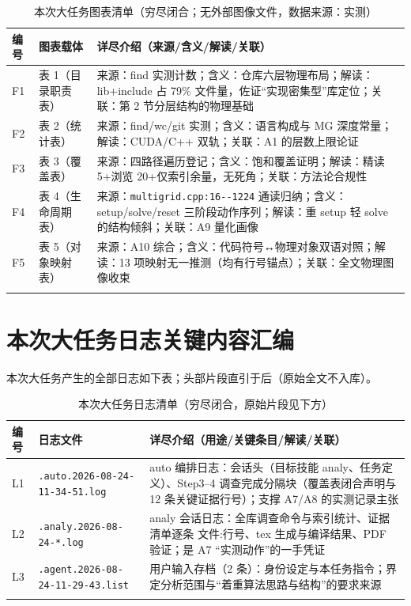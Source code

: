 \documentclass[UTF8]{ctexart}
\begin{document}
\begin{xltabular}{\textwidth}{llX}
\toprule
编号 & 图表载体 & 详尽介绍（来源/含义/解读/关联） \\
\midrule
\endhead
F1 & 表 1（目录职责表） & 来源：find 实测计数；含义：仓库六层物理布局；解读：lib+include 占 79\% 文件量，佐证``实现密集型''库定位；关联：第 2 节分层结构的物理基础 \\
F2 & 表 2（统计表） & 来源：find/wc/git 实测；含义：语言构成与 MG 深度常量；解读：CUDA/C++ 双轨；关联：A1 的层数上限论证 \\
F3 & 表 3（覆盖表） & 来源：四路径遍历登记；含义：饱和覆盖证明；解读：精读 5+浏览 20+仅索引余量，无死角；关联：方法论合规性 \\
F4 & 表 4（生命周期表） & 来源：\textcolor{evidence}{\texttt{\nolinkurl{multigrid.cpp:16--1224}}} 通读归纳；含义：setup/solve/reset 三阶段动作序列；解读：重 setup 轻 solve 的结构倾斜；关联：A9 量化画像 \\
F5 & 表 5（对象映射表） & 来源：A10 综合；含义：代码符号↔物理对象双语对照；解读：13 项映射无一推测（均有行号锚点）；关联：全文物理图像收束 \\
\bottomrule
\caption{本次大任务图表清单（穷尽闭合；无外部图像文件，数据来源：实测）}
\end{xltabular}

\section{本次大任务日志关键内容汇编}

本次大任务产生的全部日志如下表；头部片段直引于后（原始全文不入库）。

\begin{xltabular}{\textwidth}{llX}
\toprule
编号 & 日志文件 & 详尽介绍（用途/关键条目/解读/关联） \\
\midrule
\endhead
L1 & \texttt{\nolinkurl{.auto.2026-08-24-11-34-51.log}} & auto 编排日志：会话头（目标技能 analy、任务定义）、Step3--4 调查完成分隔块（覆盖表闭合声明与 12 条关键证据行号）；支撑 A7/A8 的实测记录主张 \\
L2 & \texttt{\nolinkurl{.analy.2026-08-24-*.log}} & analy 会话日志：全库调查命令与索引统计、证据清单逐条 文件:行号、tex 生成与编译结果、PDF 验证；是 A7 ``实测动作''的一手凭证 \\
L3 & \texttt{\nolinkurl{.agent.2026-08-24-11-29-43.list}} & 用户输入存档（2 条）：身份设定与本任务指令；界定分析范围与``着重算法思路与结构''的要求来源 \\
\bottomrule
\caption{本次大任务日志清单（穷尽闭合，原始片段见下方）}
\end{xltabular}
\end{document}

